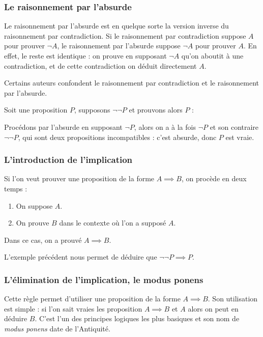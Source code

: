 \subsubsection{Le raisonnement par l'absurde}

Le raisonnement par l'absurde est en quelque sorte la version inverse du raisonnement par contradiction. Si le raisonnement par contradiction suppose $A$ pour prouver $\lnot A$, le raisonnement par l'absurde suppose $\lnot A$ pour prouver $A$. En effet, le reste est identique : on prouve en supposant $\lnot A$ qu'on aboutit à une contradiction, et de cette contradiction on déduit directement $A$.

Certains auteurs confondent le raisonnement par contradiction et le raisonnement par l'absurde.

\begin{expl}
    Soit une proposition $P$, supposons $\lnot \lnot P$ et prouvons alors $P$ :
    
    Procédons par l'absurde en supposant $\lnot P$, alors on a à la fois $\lnot P$ et son contraire $\lnot \lnot P$, qui sont deux propositions incompatibles : c'est absurde, donc $P$ est vraie.
\end{expl}

\subsubsection{L'introduction de l'implication}

Si l'on veut prouver une proposition de la forme $A\implies B$, on procède en deux temps :

\begin{enumerate}
    \item On suppose $A$.
    \item On prouve $B$ dans le contexte où l'on a supposé $A$.
\end{enumerate}

Dans ce cas, on a prouvé $A\implies B$.

\begin{expl}
    L'exemple précédent nous permet de déduire que $\lnot\lnot P \implies P$.
\end{expl}

\subsubsection{L'élimination de l'implication, le modus ponens}

Cette règle permet d'utiliser une proposition de la forme $A\implies B$. Son utilisation est simple : si l'on sait vraies les proposition $A\implies B$ et $A$ alors on peut en déduire $B$. C'est l'un des principes logiques les plus basiques et son nom de \textit{modus ponens} date de l'Antiquité.

